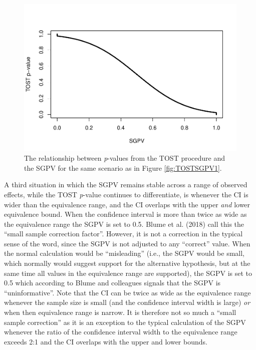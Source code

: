 \documentclass[,man,floatsintext]{apa6}
\begin{document}
\begin{figure}
\centering
\includegraphics{manuscript.R1_files/figure-latex/TOSTSGPV5-1.pdf}
\caption{\label{fig:TOSTSGPV5}The relationship between \emph{p}-values from
the TOST procedure and the SGPV for the same scenario as in Figure
\ref{fig:TOSTSGPV1}.}
\end{figure}

A third situation in which the SGPV remains stable across a range of
observed effects, while the TOST \emph{p}-value continues to
differentiate, is whenever the CI is wider than the equivalence range,
and the CI overlaps with the upper \emph{and} lower equivalence bound.
When the confidence interval is more than twice as wide as the
equivalence range the SGPV is set to 0.5. Blume et al. (2018) call this
the \enquote{small sample correction factor}. However, it is not a
correction in the typical sense of the word, since the SGPV is not
adjusted to any \enquote{correct} value. When the normal calculation
would be \enquote{misleading} (i.e., the SGPV would be small, which
normally would suggest support for the alternative hypothesis, but at
the same time all values in the equivalence range are supported), the
SGPV is set to 0.5 which according to Blume and colleagues signals that
the SGPV is \enquote{uninformative}. Note that the CI can be twice as
wide as the equivalence range whenever the sample size is small (and the
confidence interval width is large) \emph{or} when then equivalence
range is narrow. It is therefore not so much a \enquote{small sample
correction} as it is an exception to the typical calculation of the SGPV
whenever the ratio of the confidence interval width to the equivalence
range exceeds 2:1 and the CI overlaps with the upper and lower bounds.
\end{document}
